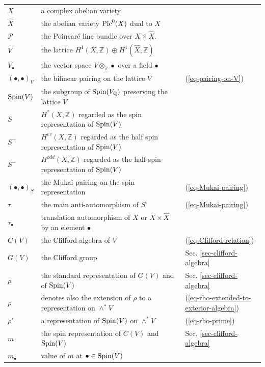 \documentclass[12pt]{amsart}
\numberwithin{equation}{subsection}
\theoremstyle{plain}
\theoremstyle{definition}
\newcommand{\QQ}{{\mathbb Q}}
\newcommand{\ZZ}{{\mathbb Z}}
\renewcommand{\P}{{\mathcal P}}
\newcommand{\Integers}{{\mathbb Z}}
\newcommand{\Spin}{{\rm Spin}}
\newcommand{\Pic}{{\rm Pic}}
\begin{document}
\hspace{1ex}
\small

\begin{longtable}{l l l}
\\
$X$ & a complex abelian variety & 
\\
$\hat{X}$ & the abelian variety $\Pic^0(X)$ dual to $X$ &
\\
$\P$ & the Poincar\'{e} line bundle over $X\times\hat{X}$. & 
\\
$V$ & the lattice $H^1(X,\Integers)\oplus H^1(\hat{X},\Integers)$ & 
\\
$V_{\bullet}$ & the vector space $V\otimes_\ZZ\bullet$ over a field $\bullet$ &
\\
$(\bullet,\bullet)_V$ & the bilinear pairing on the lattice $V$ & (\ref{eq-pairing-on-V})
\\
$\Spin(V)$ & the subgroup of $\Spin(V_\QQ)$ preserving the lattice $V$ &
\\
$S$ & $H^*(X,\ZZ)$ regarded as the spin representation of $\Spin(V)$ &
\\
$S^+$ & $H^{ev}(X,\ZZ)$ regarded as the half spin representation of $\Spin(V)$
\\
$S^-$ & $H^{odd}(X,\ZZ)$ regarded as the half spin representation of $\Spin(V)$
\\
$(\bullet,\bullet)_S$ & the Mukai pairing on the spin representation & (\ref{eq-Mukai-pairing})
\\
$\tau$ &  the main anti-automorphism of $S$ & (\ref{eq-Mukai-pairing})
\\
$\tau_{\bullet}$ & translation automorphism of $X$ or $X\times\hat{X}$ by an element $\bullet$
\\
$C(V)$ & the Clifford algebra of $V$ & (\ref{eq-Clifford-relation})
\\
$G(V)$ & the Clifford group & Sec. \ref{sec-clifford-algebra}
\\
$\rho$ & the standard representation of $G(V)$ and of $\Spin(V)$ & Sec. \ref{sec-clifford-algebra}
\\
$\rho$ & denotes also the extension of $\rho$ to a representation on $\wedge^*V$ & (\ref{eq-rho-extended-to-exterior-algebra})
\\
$\rho'$ & a representation of $\Spin(V)$ on $\wedge^*V$ & (\ref{eq-rho-prime})
\\
$m$ & the spin representation of $C(V)$ and $\Spin(V)$ & Sec. \ref{sec-clifford-algebra}
\\
$m_\bullet$ & value of $m$ at $\bullet\in \Spin(V)$ & 
\\

\end{longtable}
\end{document}
